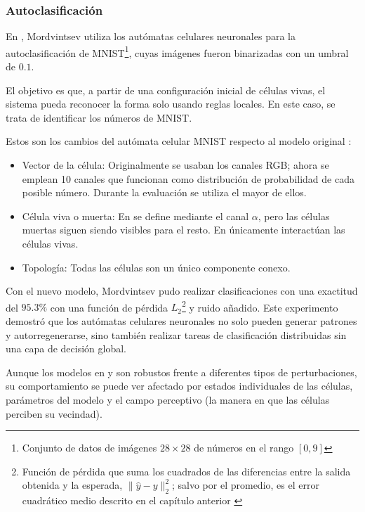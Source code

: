 \subsubsection{Autoclasificación}

En \cite{mordvintsev2020_mnist}, Mordvintsev utiliza los autómatas celulares neuronales para la autoclasificación de MNIST\footnote{Conjunto de datos de imágenes $28 \times 28$ de números en el rango $[0,9]$}, cuyas imágenes fueron binarizadas con un umbral de $0.1$. 

El objetivo es que, a partir de una configuración inicial de células vivas, el sistema pueda reconocer la forma solo usando reglas locales. En este caso, se trata de identificar los números de MNIST.

Estos son los cambios del autómata celular MNIST respecto al modelo original \cite{mordvintsev2020_nca}:

\begin{itemize}
	
	\item Vector de la célula: Originalmente se usaban los canales RGB; ahora se emplean 10 canales que funcionan como distribución de probabilidad de cada posible número. Durante la evaluación se utiliza el mayor de ellos.
	
	\item Célula viva o muerta: En \cite{mordvintsev2020_nca} se define mediante el canal $\alpha$, pero las células muertas siguen siendo visibles para el resto. En \cite{mordvintsev2020_mnist} únicamente interactúan las células vivas.
	
	\item Topología: Todas las células son un único componente conexo.
\end{itemize}

Con el nuevo modelo, Mordvintsev pudo realizar clasificaciones con una exactitud del $95.3\%$ con una función de pérdida $L_2$\footnote{Función de pérdida que suma los cuadrados de las diferencias entre la salida obtenida y la esperada, $\| \hat{y} - y \|_2^2$; salvo por el promedio, es el error cuadrático medio descrito en el capítulo anterior \cite{goodfellow2016_dl}} y ruido añadido. Este experimento demostró que los autómatas celulares neuronales no solo pueden generar patrones y autorregenerarse, sino también realizar tareas de clasificación distribuidas sin una capa de decisión global.

Aunque los modelos en \cite{mordvintsev2020_nca} y \cite{mordvintsev2020_mnist} son robustos frente a diferentes tipos de perturbaciones, su comportamiento se puede ver afectado por estados individuales de las células, parámetros del modelo y el campo perceptivo (la manera en que las células perciben su vecindad).

